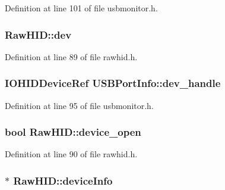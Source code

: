 \-Definition at line 101 of file usbmonitor.\-h.

\hypertarget{group___raw_h_i_d_plugin_ga4939588bf5bf31e39139a75ca4319884}{
\subsubsection[{dev}]{ {\bf \-Raw\-H\-I\-D\-::dev}}}\label{group___raw_h_i_d_plugin_ga4939588bf5bf31e39139a75ca4319884}


\-Definition at line 89 of file rawhid.\-h.

\hypertarget{group___raw_h_i_d_plugin_gaa788f428f81fe24d5fd83a27fc3761c2}{
\subsubsection[{dev\-\_\-handle}]{\setlength{\rightskip}{0pt plus 5cm}\-I\-O\-H\-I\-D\-Device\-Ref {\bf \-U\-S\-B\-Port\-Info\-::dev\-\_\-handle}}}\label{group___raw_h_i_d_plugin_gaa788f428f81fe24d5fd83a27fc3761c2}


\-Definition at line 95 of file usbmonitor.\-h.

\hypertarget{group___raw_h_i_d_plugin_ga6ec3ad7c063679816e5aafed60f677c3}{
\subsubsection[{device\-\_\-open}]{\setlength{\rightskip}{0pt plus 5cm}bool {\bf \-Raw\-H\-I\-D\-::device\-\_\-open}}}\label{group___raw_h_i_d_plugin_ga6ec3ad7c063679816e5aafed60f677c3}


\-Definition at line 90 of file rawhid.\-h.

\hypertarget{group___raw_h_i_d_plugin_gab9b0f096459d4bc5a220ac42e9465752}{
\subsubsection[{device\-Info}]{$\ast$ {\bf \-Raw\-H\-I\-D\-::device\-Info}}}\label{group___raw_h_i_d_plugin_gab9b0f096459d4bc5a220ac42e9465752}


